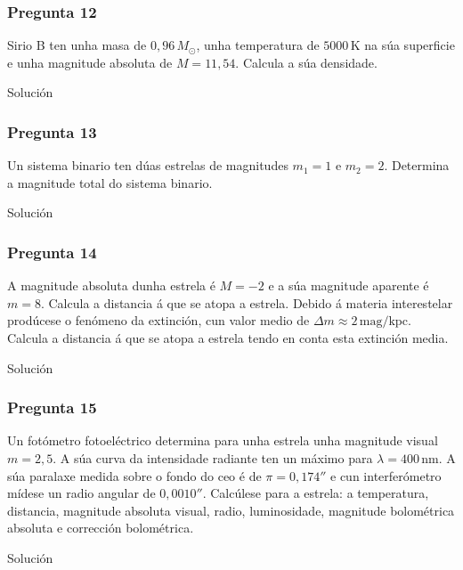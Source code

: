 \vspace*{2em}

\begin{Enunciado}
	\subsubsection{Pregunta 12}

	Sirio B ten unha masa de $0{,}96\,M_\odot$, unha temperatura de $5000\,\text{K}$ na súa superficie e unha magnitude absoluta de $M = 11{,}54$. Calcula a súa densidade.

\end{Enunciado}
Solución

\vspace*{2em}

\begin{Enunciado}
	\subsubsection{Pregunta 13}

	Un sistema binario ten dúas estrelas de magnitudes $m_1 = 1$ e $m_2 = 2$. Determina a magnitude total do sistema binario.

\end{Enunciado}
Solución

\vspace*{2em}

\begin{Enunciado}
	\subsubsection{Pregunta 14}

	A magnitude absoluta dunha estrela é $M = -2$ e a súa magnitude aparente é $m = 8$. Calcula a distancia á que se atopa a estrela. Debido á materia interestelar prodúcese o fenómeno da extinción, cun valor medio de $\Delta m \approx 2\,\text{mag/kpc}$. Calcula a distancia á que se atopa a estrela tendo en conta esta extinción media.

\end{Enunciado}
Solución

\vspace*{2em}

\begin{Enunciado}
	\subsubsection{Pregunta 15}

	Un fotómetro fotoeléctrico determina para unha estrela unha magnitude visual $m = 2{,}5$. A súa curva da intensidade radiante ten un máximo para $\lambda = 400\,\text{nm}$. A súa paralaxe medida sobre o fondo do ceo é de $\pi = 0{,}174''$ e cun interferómetro mídese un radio angular de $0{,}0010''$. Calcúlese para a estrela: a temperatura, distancia, magnitude absoluta visual, radio, luminosidade, magnitude bolométrica absoluta e corrección bolométrica.

\end{Enunciado}
Solución

